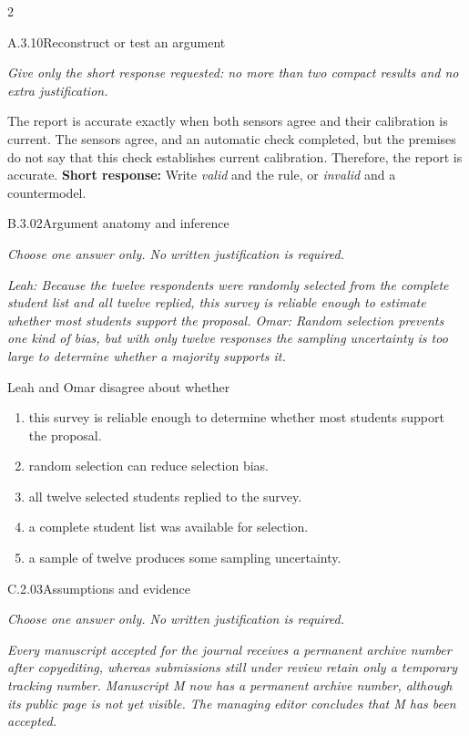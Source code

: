 \documentclass[9pt]{extarticle}
\newcommand{\choice}[1]{\item #1}
\begin{document}
\CoreWorkArea
\FormBreak
{}
\begin{multicols}{2}
\begin{DenseCoreProblem}{A.3.10}{Reconstruct or test an argument}
{\scriptsize\textit{Give only the short response requested: no more than two compact results and no extra justification.}\par}
The report is accurate exactly when both sensors agree and their calibration is current. The sensors agree, and an automatic check completed, but the premises do not say that this check establishes current calibration. Therefore, the report is accurate.
\textbf{Short response:} Write \emph{valid} and the rule, or \emph{invalid} and a countermodel.
\end{DenseCoreProblem}
\begin{DenseCoreProblem}{B.3.02}{Argument anatomy and inference}
{\scriptsize\textit{Choose one answer only. No written justification is required.}\par}
\emph{Leah: Because the twelve respondents were randomly selected from the complete student list and all twelve replied, this survey is reliable enough to estimate whether most students support the proposal. Omar: Random selection prevents one kind of bias, but with only twelve responses the sampling uncertainty is too large to determine whether a majority supports it.}

Leah and Omar disagree about whether
\begin{enumerate}[label=(\alph*)]
  \choice{this survey is reliable enough to determine whether most students support the proposal.}
  \choice{random selection can reduce selection bias.}
  \choice{all twelve selected students replied to the survey.}
  \choice{a complete student list was available for selection.}
  \choice{a sample of twelve produces some sampling uncertainty.}
\end{enumerate}
\end{DenseCoreProblem}
\columnbreak
\begin{DenseCoreProblem}{C.2.03}{Assumptions and evidence}
{\scriptsize\textit{Choose one answer only. No written justification is required.}\par}
\emph{Every manuscript accepted for the journal receives a permanent archive number after copyediting, whereas submissions still under review retain only a temporary tracking number. Manuscript M now has a permanent archive number, although its public page is not yet visible. The managing editor concludes that M has been accepted.}


\end{DenseCoreProblem}
\end{multicols}
\end{document}
